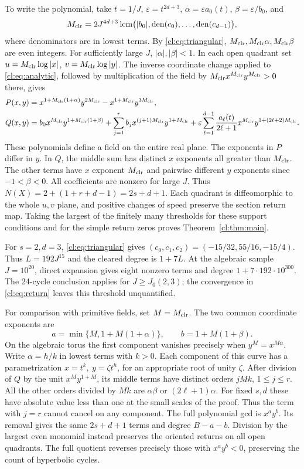 To write the polynomial, take \(t=1/J\), \(\varepsilon=t^{2d+3}\),
\(\alpha=\varepsilon a_0(t)\), \(\beta=\varepsilon/b_0\), and
\[
 M_{\mathrm{clr}}{}=2J^{4d+3}\operatorname{lcm}
  \bigl(|b_0|,\operatorname{den}(c_0),\ldots,\operatorname{den}(c_{d-1})\bigr),
\]
where denominators are in lowest terms. By \eqref{cl:eq:triangular},
\(M_{\mathrm{clr}}{},M_{\mathrm{clr}}{}\alpha,M_{\mathrm{clr}}{}\beta\) are even integers. For sufficiently large \(J\),
\(|\alpha|,|\beta|<1\). In each open quadrant set \(u=M_{\mathrm{clr}}{}\log|x|\),
\(v=M_{\mathrm{clr}}{}\log|y|\). The inverse coordinate change applied to
\eqref{cl:eq:analytic}, followed by multiplication of the field by
\(M_{\mathrm{clr}}{}x^{M_{\mathrm{clr}}} y^{M_{\mathrm{clr}}}>0\) there, gives
\begin{align}
 P(x,y)={}& x^{1+M_{\mathrm{clr}}{}(1+\alpha)}y^{2M_{\mathrm{clr}}{}}-x^{1+M_{\mathrm{clr}}{}}y^{3M_{\mathrm{clr}}{}},\notag\\
 Q(x,y)={}& b_0 x^{M_{\mathrm{clr}}} y^{1+M_{\mathrm{clr}}{}(1+\beta)}
  +\sum_{j=1}^{r} b_j x^{(j+1)M_{\mathrm{clr}}{}}y^{1+M_{\mathrm{clr}}{}}
  +\varepsilon\sum_{\ell=1}^{d-1}\frac{a_\ell(t)}{2\ell+1}
                x^{M_{\mathrm{clr}}} y^{1+(2\ell+2)M_{\mathrm{clr}}{}}.                \label{cl:eq:field}
\end{align}
These polynomials define a field on the entire real plane. The exponents
in \(P\) differ in \(y\). In \(Q\), the middle sum has distinct \(x\)
exponents all greater than \(M_{\mathrm{clr}}{}\). The other terms have \(x\) exponent \(M_{\mathrm{clr}}{}\)
and pairwise different \(y\) exponents since \(-1<\beta<0\).
All coefficients are nonzero for large \(J\). Thus
\(N(X)=2+(1+r+d-1)=2s+d+1\). Each quadrant is diffeomorphic to the
whole \(u,v\) plane, and positive changes of speed preserve the section
return map. Taking the largest of the finitely many thresholds for these support conditions and for the simple return zeros proves Theorem~\ref{cl:thm:main}.

For \(s=2,d=3\), \eqref{cl:eq:triangular} gives
\((c_0,c_1,c_2)=(-15/32,55/16,-15/4)\). Thus \(L=192J^{15}\) and the cleared degree is \(1+7L\). At the algebraic sample \(J=10^{20}\), direct expansion gives eight nonzero terms and degree \(1+7\cdot192\cdot10^{300}\). The 24-cycle conclusion applies for \(J\ge J_0(2,3)\); the convergence in \eqref{cl:eq:return} leaves this threshold unquantified.

For comparison with primitive fields, set \(M=M_{\mathrm{clr}}\). The two common coordinate exponents are
\[
 a=\min\{M,1+M(1+\alpha)\},\qquad b=1+M(1+\beta).
\]
On the algebraic torus the first component vanishes precisely when \(y^M=x^{M\alpha}\). Write \(\alpha=h/k\) in lowest terms with \(k>0\). Each component of this curve has a parametrization \(x=t^k,\ y=\zeta t^h\), for an appropriate root of unity \(\zeta\). After division of \(Q\) by the unit \(x^M y^{1+M}\), its middle terms have distinct orders \(jMk\), \(1\le j\le r\). All the other orders divided by \(Mk\) are \(\alpha\beta\) or \((2\ell+1)\alpha\). For fixed \(s,d\) these have absolute value less than one at the small scales of the proof. Thus the term with \(j=r\) cannot cancel on any component. The full polynomial gcd is \(x^a y^b\). Its removal gives the same \(2s+d+1\) terms and degree \(B-a-b\). Division by the largest even monomial instead preserves the oriented returns on all open quadrants. The full quotient reverses precisely those with \(x^ay^b<0\), preserving the count of hyperbolic cycles.

